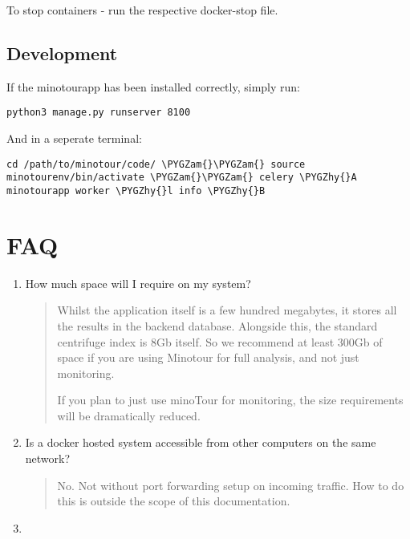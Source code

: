 \documentclass[letterpaper,10pt,english]{sphinxmanual}
\def\PYGZam{\char`\&}
\def\PYGZhy{\char`\-}
\begin{document}
To stop containers - run the respective docker-stop file.


\section{Development}
\label{quickstart:development}
If the minotourapp has been installed correctly, simply run:

\begin{Verbatim}[commandchars=\\\{\}]
python3 manage.py runserver 8100
\end{Verbatim}

And in a seperate terminal:

\begin{Verbatim}[commandchars=\\\{\}]
cd /path/to/minotour/code/ \PYGZam{}\PYGZam{} source minotourenv/bin/activate \PYGZam{}\PYGZam{} celery \PYGZhy{}A minotourapp worker \PYGZhy{}l info \PYGZhy{}B
\end{Verbatim}


\chapter{FAQ}
\label{faqs::doc}\label{faqs:faq}\begin{enumerate}
\item {} 
How much space will I require on my system?
\begin{quote}

Whilst the application itself is a few hundred megabytes, it stores all the results in the backend database.
Alongside this, the standard centrifuge index is 8Gb itself. So we recommend at least 300Gb of space if you are using Minotour for full analysis, and not just monitoring.

If you plan to just use minoTour for monitoring, the size requirements will be dramatically reduced.
\end{quote}

\item {} 
Is a docker hosted system accessible from other computers on the same network?
\begin{quote}

No. Not without port forwarding setup on incoming traffic. How to do this is outside the scope of this documentation.
\end{quote}

\item {} 
\end{enumerate}



\renewcommand{\indexname}{Index}
\printindex
\end{document}
